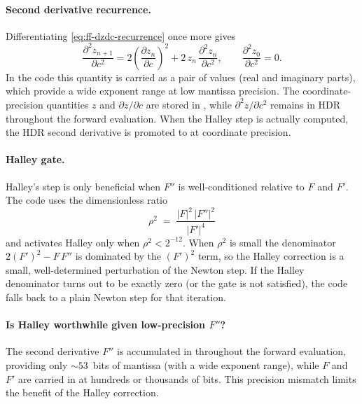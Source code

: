 \paragraph{Second derivative recurrence.}
Differentiating \cref{eq:ff-dzdc-recurrence} once more gives
\begin{equation}\label{eq:ff-d2zdc2}
\frac{\partial^2 z_{n+1}}{\partial c^2}
  = 2\left(\frac{\partial z_n}{\partial c}\right)^{\!2}
  + 2\,z_n\,\frac{\partial^2 z_n}{\partial c^2},
\qquad \frac{\partial^2 z_0}{\partial c^2} = 0.
\end{equation}
In the code this quantity is carried as a pair of 
values (real and imaginary parts), which provide a wide exponent range at low
mantissa precision.  The coordinate-precision quantities $z$ and
$\partial z/\partial c$ are stored in , while
$\partial^2 z/\partial c^2$ remains in HDR throughout the forward
evaluation.  When the Halley step is actually computed, the HDR second
derivative is promoted to  at coordinate precision.

\paragraph{Halley gate.}
Halley's step is only beneficial when $F''$ is well-conditioned relative to
$F$ and $F'$.  The code uses the dimensionless ratio
\begin{equation}\label{eq:ff-halley-gate}
\rho^2 \;=\;
  \frac{|F|^2\,|F''|^2}{|F'|^4}
\end{equation}
and activates Halley only when $\rho^2 < 2^{-12}$.  When $\rho^2$ is
small the denominator $2(F')^2 - F\,F''$ is dominated by the $(F')^2$ term,
so the Halley correction is a small, well-determined perturbation of the
Newton step.  If the Halley denominator turns out to be exactly zero (or the
gate is not satisfied), the code falls back to a plain Newton step for that
iteration.

\paragraph{Is Halley worthwhile given low-precision $F''$?}
The second derivative $F''$ is accumulated in 
throughout the forward evaluation, providing only ${\sim}53$~bits of
mantissa (with a wide exponent range), while $F$ and $F'$ are carried in
 at hundreds or thousands of bits.  This precision mismatch
limits the benefit of the Halley correction.

